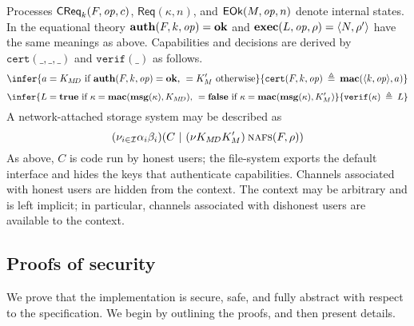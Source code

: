 \documentclass[10pt]{article}
\newcommand{\func}[1]{{\bf #1}}
\newcommand{\op}{{\it op}}
\newcommand{\tup}[1]{\langle #1\rangle}
\newcommand{\new}[2]{(\nu #1)\:#2}
\newcommand{\Req}{\mathsf{Req}}
\newcommand{\Comm}{\mathsf{EOk}}
\newcommand{\AReq}{\mathsf{CReq}}
\begin{document}
Processes $\AReq_k(F,\op,c)$, $\Req(\kappa,n)$, and $\Comm(M,\op,n)$ denote internal states. 
In the equational theory $\func{auth}(F,k,\op) = \func{ok}$ and $\func{exec}(L,\op,\rho) = \tup{N,\rho'}$ have the same meanings as above. Capabilities and decisions are derived by $\mathtt{cert}(\_,\_,\_)$ and  $\mathtt{verif}(\_)$ as follows.
$$\infer
	{a = K_{M\!D}\mbox{ if }\func{auth}(F,k,\op) = \func{ok}\mbox{, }=K'_M\mbox{ otherwise}}
	{\mathtt{cert}(F,k,\op) \:\triangleq\: \func{mac}(\tup{k,\op},a)}
$$
$$\infer
	{L = \func{true}\mbox{ if }\kappa = \func{mac}(\func{msg}(\kappa),K_{M\!D})\mbox{, }=\func{false}\mbox{ if }\kappa = \func{mac}(\func{msg}(\kappa),K'_M)}
	{\mathtt{verif}(\kappa) \:\triangleq\: L}
$$
A network-attached storage system may be described as 
$$(\nu_{i \in \mathcal I}\alpha_i\beta_i)(C~|~\new{K_{M\!D}K'_M}\textsc{nafs}(F,\rho))$$
As above, $C$ is code run by honest users; the file-system exports the default interface and hides the keys that authenticate capabilities. Channels associated with honest users are hidden from the context. The context may be arbitrary and is left implicit; in particular, channels associated with dishonest users are available to the context.

\subsection{Proofs of security}
We prove that the implementation is secure, safe, and fully abstract with respect to the specification. We begin by outlining the proofs, and then present details.
\end{document}
